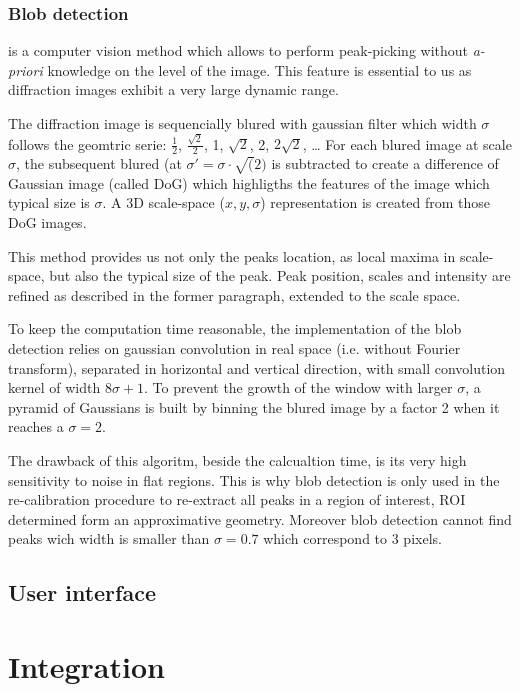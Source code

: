 \documentclass[preprint]{iucr}
\begin{document}
\subsubsection{Blob detection}
is a computer vision method which allows to perform peak-picking without
\textit{a-priori} knowledge on the level of the image.
This feature is essential to us as diffraction images exhibit a very large
dynamic range.

The diffraction image is sequencially blured with gaussian filter which
width $\sigma$ follows the geomtric serie: $\frac{1}{2}$,
$\frac{\sqrt{2}}{2}$, 1, $\sqrt{2}$, 2, $2\sqrt{2}$, \ldots
For each blured image at scale $\sigma$, the subsequent blured (at
$\sigma'=\sigma\cdot\sqrt(2)$
is subtracted to create a difference of Gaussian
image (called DoG) which highligths the features of the image which typical size
is $\sigma$. 
A 3D scale-space ($x,y,\sigma$) representation is created from those DoG images.

This method provides us not only the peaks location, as local maxima in
scale-space, but also the typical size of the peak. 
Peak position, scales and intensity are refined as described in the former
paragraph, extended to the scale space.

To keep the computation time reasonable, the implementation of the blob
detection relies on gaussian convolution in real space (i.e. without Fourier
transform), separated in horizontal and vertical direction, with small
convolution kernel of width $8 \sigma +1$.
To prevent the growth of the window with larger $\sigma$, a pyramid of Gaussians
is built by binning the blured image by a factor 2 when it reaches a $\sigma=2$.

The drawback of this algoritm, beside the calcualtion time, is its very high
sensitivity to noise in flat regions. 
This is why blob detection is only used in the re-calibration procedure to
re-extract all peaks in a region of interest, ROI determined form an
approximative geometry.
Moreover blob detection cannot find peaks wich width is smaller than  
$\sigma=0.7$ which correspond to 3 pixels.


\subsection{User interface}



\section{Integration}
\end{document}
